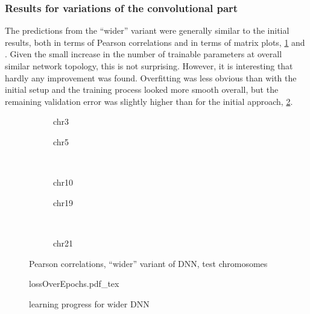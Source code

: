 \subsubsection{Results for variations of the convolutional part}
The predictions from the ``wider'' variant were generally similar to the initial results,
both in terms of Pearson correlations and in terms of matrix plots, \cref{fig:results:widerDNN_pearson} and \xxx.
Given the small increase in the number of trainable parameters at overall similar network topology, this is not surprising.
However, it is interesting that hardly any improvement was found.
Overfitting was less obvious than with the initial setup and the training process looked more smooth overall, 
but the remaining validation error was slightly higher than for the initial approach, \cref{fig:results:widerDNN_lossEpochs}.
\begin{figure}[p]
    \begin{subfigure}{0.45\textwidth}
        \scriptsize
        \caption{chr3}
    \end{subfigure} \hfill
    \begin{subfigure}{0.45\textwidth}
        \scriptsize
        \caption{chr5}
    \end{subfigure}\\[5mm]
    \begin{subfigure}{0.45\textwidth}
        \scriptsize
        \caption{chr10}
    \end{subfigure}\hfill
    \begin{subfigure}{0.45\textwidth}
        \scriptsize
        \caption{chr19}
    \end{subfigure}\\[3mm]
    \centering
    \begin{subfigure}{0.45\textwidth}
        \scriptsize
        \caption{chr21}
    \end{subfigure}
    \caption{Pearson correlations, ``wider'' variant of DNN,  test chromosomes}
    \label{fig:results:widerDNN_pearson}
\end{figure}
\begin{figure}[hbp]
 \centering
 \scriptsize
 {lossOverEpochs.pdf_tex}
 \caption{learning progress for wider DNN} \label{fig:results:widerDNN_lossEpochs}
\end{figure}

